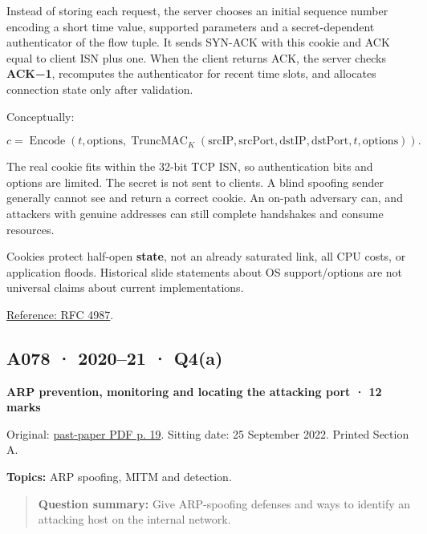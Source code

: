 \documentclass[11pt,a4paper]{article}
\begin{document}
Instead of storing each request,\allowbreak{} the server chooses an initial sequence number encoding a short time value,\allowbreak{} supported parameters and a secret-dependent authenticator of the flow tuple. It sends SYN-ACK with this cookie and ACK equal to client ISN plus one. When the client returns ACK,\allowbreak{} the server checks \textbf{ACK−1},\allowbreak{} recomputes the authenticator for recent time slots,\allowbreak{} and allocates connection state only after validation.


Conceptually:



\[
c=\operatorname{Encode}\left(t,\mathrm{options},\operatorname{TruncMAC}_K(\mathrm{srcIP},\mathrm{srcPort},\mathrm{dstIP},\mathrm{dstPort},t,\mathrm{options})\right).
\]

The real cookie fits within the 32-bit TCP ISN,\allowbreak{} so authentication bits and options are limited. The secret is not sent to clients. A blind spoofing sender generally cannot see and return a correct cookie. An on-path adversary can,\allowbreak{} and attackers with genuine addresses can still complete handshakes and consume resources.


Cookies protect half-open \textbf{state},\allowbreak{} not an already saturated link,\allowbreak{} all CPU costs,\allowbreak{} or application floods. Historical slide statements about OS support/\allowbreak{}options are not universal claims about current implementations.


\href{https://www.rfc-editor.org/rfc/rfc4987}{Reference: RFC 4987}.




\clearpage
\subsection{A078 · 2020–21 · Q4(a)}\label{a078}

\textbf{ARP prevention,\allowbreak{} monitoring and locating the attacking port · 12 marks}


Original: \href{../../CSE405-Security_Merged.pdf\#page=19}{past-paper PDF p. 19}. Sitting date: 25 September 2022. Printed Section A.


\textbf{Topics:} ARP spoofing,\allowbreak{} MITM and detection.



\begin{quote}\small

\textbf{Question summary:} Give ARP-spoofing defenses and ways to identify an attacking host on the internal network.



\end{quote}
\end{document}
